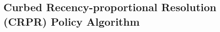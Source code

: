 \subsection{Curbed Recency-proportional Resolution (CRPR) Policy Algorithm}
\label{sec:curbed-recency-proportional-resolution-algo}

% 

% 

% 
% 
